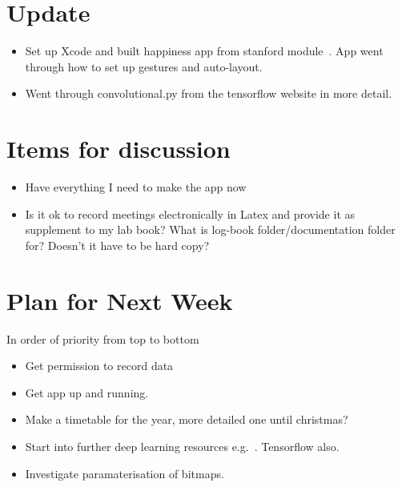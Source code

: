 \documentclass[]{weekly-report}
\begin{document}

\def\studentname{Philip Corr}
\def\projecttitle{ConvNets for iOS Gesture Recognition Applications}
\def\ucdstudentnumber{12318581}
\def\weeklyreportnumber{2}
\maketitle


\section{Update}

\begin{itemize}

\item Set up Xcode and built happiness app from stanford module~\cite{PaulHegarty2016}. App went through how to set up gestures and auto-layout.

\item Went through convolutional.py from the tensorflow website in more detail. 
	
\end{itemize}

\section{Items for discussion}

\begin{itemize}

\item Have everything I need to make the app now

\item Is it ok to record meetings electronically in Latex and provide it as supplement to my lab book? What is log-book folder/documentation folder for? Doesn't it have to be hard copy?

\end{itemize}

\section{Plan for Next Week}
In order of priority from top to bottom

\begin{itemize}
\item Get permission to record data

\item Get app up and running.

\item Make a timetable for the year, more detailed one until christmas?

\item Start into further deep learning resources e.g.~\cite{Ng-Coursera-2016, VincentVanhoucke-Udacity-2016, Nvidia-DL-Course-2016}. Tensorflow also.

\item Investigate paramaterisation of bitmaps.

\end{itemize}
\end{document}
